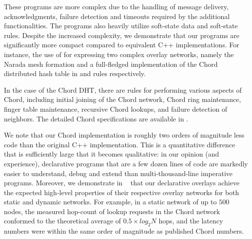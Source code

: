 These programs are more complex due to the handling of message
delivery, acknowledgments, failure detection and timeouts required by
the additional functionalities. The programs also heavily utilize
soft-state data and soft-state rules.  Despite the increased
complexity, we demonstrate that our \Dlog programs are significantly
more compact compared to equivalent C++ implementations. For instance,
the use of \Dlog for expressing two complex overlay networks, namely
the Narada mesh formation and a full-fledged implementation of the
Chord distributed hash table in \PNaradaLines and \PChordLines rules
respectively. 

In the case of the Chord DHT, there are rules for performing various
aspects of Chord, including initial joining of the Chord network,
Chord ring maintenance, finger table maintenance, recursive Chord
lookups, and failure detection of neighbors. The detailed Chord
specifications are available in \cite{boonThesis}.

We note that our Chord implementation is roughly two orders of
magnitude less code than the original C++ implementation. This is a
quantitative difference that is sufficiently large that it becomes
qualitative: in our opinion (and experience), declarative programs
that are a few dozen lines of code are markedly easier to understand,
debug and extend than multi-thousand-line imperative programs.
Moreover, we demonstrate in ~\cite{boonThesis,declareOverlays} that
our declarative overlays achieve the expected high-level properties of
their respective overlay networks for both static and dynamic
networks. For example, in a static network of up to $500$ nodes, the
measured hop-count of lookup requests in the Chord network conformed
to the theoretical average of $0.5 \times log_{2}N$ hops, and the
latency numbers were within the same order of magnitude as published
Chord numbers.



 





